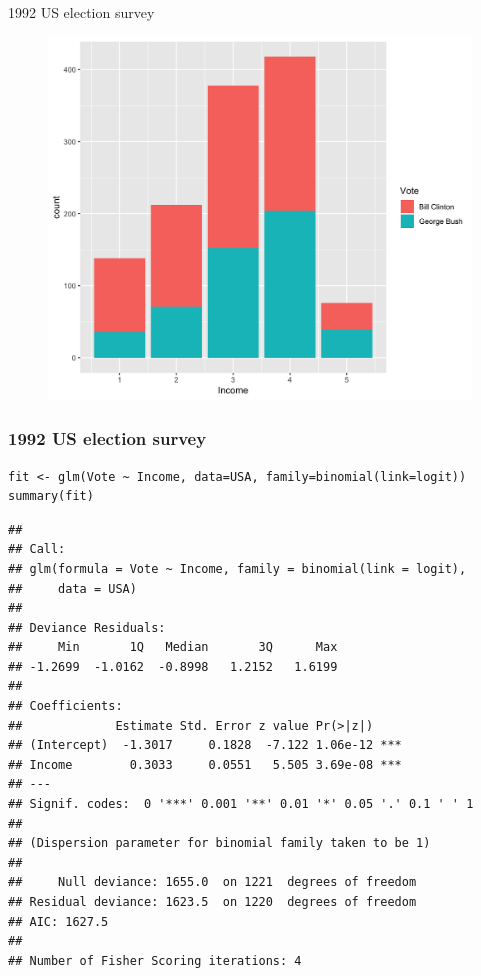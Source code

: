 \documentclass[pdf]{beamer}
\begin{document}
\begin{frame}{1992 US election survey}

\begin{figure}
\includegraphics[width=.7\textwidth]{survey.png}
\end{figure}

\end{frame}

\begin{frame}[fragile]
\frametitle{1992 US election survey}

\begin{lstlisting}[style=R]
fit <- glm(Vote ~ Income, data=USA, family=binomial(link=logit))
summary(fit)
\end{lstlisting}

\tiny
\begin{verbatim}
## 
## Call:
## glm(formula = Vote ~ Income, family = binomial(link = logit), 
##     data = USA)
## 
## Deviance Residuals: 
##     Min       1Q   Median       3Q      Max  
## -1.2699  -1.0162  -0.8998   1.2152   1.6199  
## 
## Coefficients:
##             Estimate Std. Error z value Pr(>|z|)    
## (Intercept)  -1.3017     0.1828  -7.122 1.06e-12 ***
## Income        0.3033     0.0551   5.505 3.69e-08 ***
## ---
## Signif. codes:  0 '***' 0.001 '**' 0.01 '*' 0.05 '.' 0.1 ' ' 1
## 
## (Dispersion parameter for binomial family taken to be 1)
## 
##     Null deviance: 1655.0  on 1221  degrees of freedom
## Residual deviance: 1623.5  on 1220  degrees of freedom
## AIC: 1627.5
## 
## Number of Fisher Scoring iterations: 4
\end{verbatim}
\normalsize

\end{frame}
\end{document}
